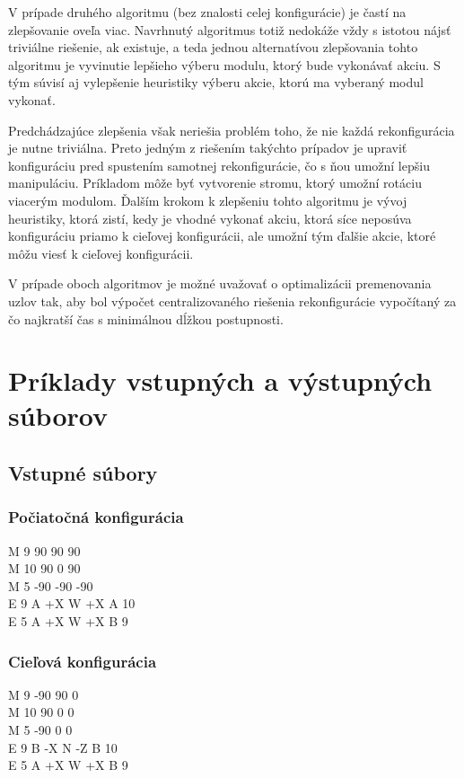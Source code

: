\documentclass[
  printed, %
  oneside, %
  notable,   %
  nolof,     %
  nolot,     %
]{fithesis3}
\begin{document}
V prípade druhého algoritmu (bez znalosti celej konfigurácie) je častí na zlepšovanie oveľa viac. Navrhnutý algoritmus totiž nedokáže vždy s istotou nájsť triviálne riešenie, ak existuje, a teda jednou alternatívou zlepšovania tohto algoritmu je vyvinutie lepšieho výberu modulu, ktorý bude vykonávať akciu. S tým súvisí aj vylepšenie heuristiky výberu akcie, ktorú ma vyberaný modul vykonať. 

Predchádzajúce zlepšenia však neriešia problém toho, že nie každá rekonfigurácia je nutne triviálna. Preto jedným z riešením takýchto prípadov je upraviť konfiguráciu pred spustením samotnej rekonfigurácie, čo s ňou umožní lepšiu manipuláciu. Príkladom môže byť vytvorenie stromu, ktorý umožní rotáciu viacerým modulom. Ďalším krokom k zlepšeniu tohto algoritmu je vývoj heuristiky, ktorá zistí, kedy je vhodné vykonať akciu, ktorá síce neposúva konfiguráciu priamo k cieľovej konfigurácii, ale umožní tým ďalšie akcie, ktoré môžu viesť k cieľovej konfigurácii. 

V prípade oboch algoritmov je možné uvažovať o optimalizácii premenovania uzlov tak, aby bol výpočet centralizovaného riešenia rekonfigurácie vypočítaný za čo najkratší čas s minimálnou dĺžkou postupnosti.


\cleardoublepage
\appendix
\chapter{Príklady vstupných a výstupných súborov}
\label{sec:inOutFiles}
\section{Vstupné súbory}
\subsection{Počiatočná konfigurácia}
M 9 90 90 90 \\
M 10 90 0 90 \\
M 5 -90 -90 -90 \\
E 9 A +X W +X A 10 \\
E 5 A +X W +X B 9

\subsection{Cieľová konfigurácia}
M 9 -90 90 0 \\
M 10 90 0 0 \\
M 5 -90 0 0 \\
E 9 B -X N -Z B 10 \\
E 5 A +X W +X B 9
\end{document}
